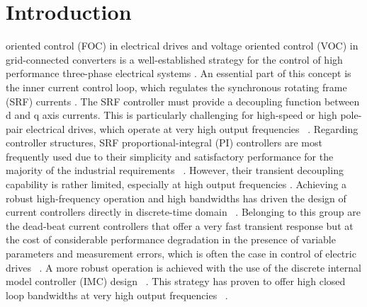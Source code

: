\documentclass[conference]{IEEEtran}
\begin{document}
\section{Introduction}
 oriented control (FOC) in electrical drives and voltage oriented control (VOC) in grid-connected converters is a well-established strategy for the control of high performance three-phase electrical systems \cite{holmes2012}. An essential part of this concept is the inner current control loop, which regulates the synchronous rotating frame (SRF) currents \cite{holmes2012}. The SRF controller must provide a decoupling function between d and q axis currents. This is particularly challenging for high-speed or high pole-pair electrical drives, which operate at very high output frequencies ~\cite{yim2009,Petric2021a}. 
Regarding controller structures, SRF proportional-integral (PI) controllers are most frequently used due to their simplicity and satisfactory performance for the majority of the industrial requirements ~\cite{yim2009,yepes2014}. However, their transient decoupling capability is rather limited, especially at high output frequencies \cite{lorenz2010}. Achieving a robust high-frequency operation and high bandwidths has driven the design of current controllers directly in discrete-time domain ~\cite{lorenz2010,vuksa2016,commentsHoffmann}. Belonging to this group are the dead-beat current controllers that offer a very fast transient response but at the cost of considerable performance degradation in the presence of variable parameters and measurement errors, which is often the case in control of electric drives ~\cite{rovere2018,xu2019,Ito2021}. A more robust operation is achieved with the use of the discrete internal model controller (IMC) design ~\cite{lorenz2010,vuksa2016,commentsHoffmann}. This strategy has proven to offer high closed loop bandwidths at very high output frequencies ~\cite{commentsHoffmann,vuksa2016,Petric2021a}.
\end{document}
